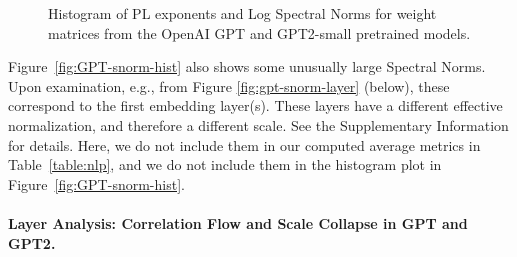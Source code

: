 \begin{figure}[h]
    \centering
    \qquad
   \caption{Histogram of PL exponents 
           and Log Spectral Norms 
           for weight matrices from the OpenAI GPT and GPT2-small pretrained models.}
   
\label{fig:GPT-hist}
\end{figure}


Figure~\ref{fig:GPT-snorm-hist} also shows some unusually large Spectral Norms.
Upon examination, e.g., from Figure \ref{fig:gpt-snorm-layer} (below), these correspond to the first embedding layer(s).
These layers have a different effective normalization, and therefore a different scale.
See the Supplementary Information
for details.
Here, we do not include them in our computed average metrics in Table~\ref{table:nlp}, and we do not include them in the histogram plot in Figure~\ref{fig:GPT-snorm-hist}.



\paragraph{Layer Analysis: Correlation Flow and Scale Collapse in GPT and GPT2.} 

